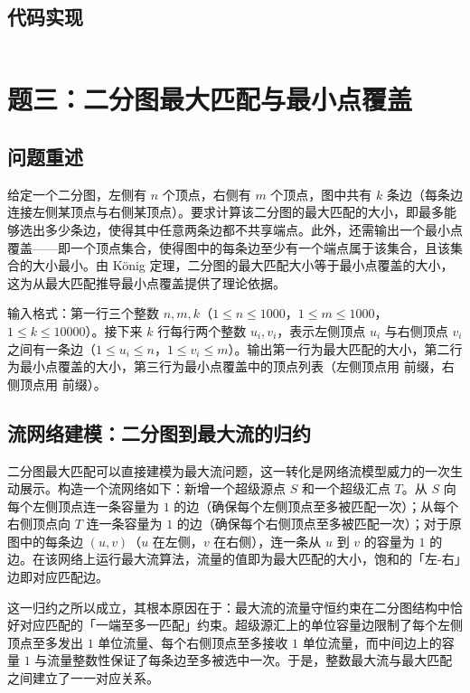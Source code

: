 \documentclass[12pt, a4paper]{academics}
\begin{document}
\subsection{代码实现}

\inputminted{c++}{../src/p2_dinic.cpp}

\section{题三：二分图最大匹配与最小点覆盖}

\subsection{问题重述}

给定一个二分图，左侧有 $n$ 个顶点，右侧有 $m$ 个顶点，图中共有 $k$ 条边（每条边连接左侧某顶点与右侧某顶点）。要求计算该二分图的最大匹配的大小，即最多能够选出多少条边，使得其中任意两条边都不共享端点。此外，还需输出一个最小点覆盖——即一个顶点集合，使得图中的每条边至少有一个端点属于该集合，且该集合的大小最小。由 K\"onig 定理，二分图的最大匹配大小等于最小点覆盖的大小，这为从最大匹配推导最小点覆盖提供了理论依据。

输入格式：第一行三个整数 $n, m, k$（$1 \le n \le 1000$，$1 \le m \le 1000$，$1 \le k \le 10000$）。接下来 $k$ 行每行两个整数 $u_i, v_i$，表示左侧顶点 $u_i$ 与右侧顶点 $v_i$ 之间有一条边（$1 \le u_i \le n$，$1 \le v_i \le m$）。输出第一行为最大匹配的大小，第二行为最小点覆盖的大小，第三行为最小点覆盖中的顶点列表（左侧顶点用  前缀，右侧顶点用  前缀）。


\subsection{流网络建模：二分图到最大流的归约}

二分图最大匹配可以直接建模为最大流问题，这一转化是网络流模型威力的一次生动展示。构造一个流网络如下：新增一个超级源点 $S$ 和一个超级汇点 $T$。从 $S$ 向每个左侧顶点连一条容量为 $1$ 的边（确保每个左侧顶点至多被匹配一次）；从每个右侧顶点向 $T$ 连一条容量为 $1$ 的边（确保每个右侧顶点至多被匹配一次）；对于原图中的每条边 $(u, v)$（$u$ 在左侧，$v$ 在右侧），连一条从 $u$ 到 $v$ 的容量为 $1$ 的边。在该网络上运行最大流算法，流量的值即为最大匹配的大小，饱和的「左-右」边即对应匹配边。

这一归约之所以成立，其根本原因在于：最大流的流量守恒约束在二分图结构中恰好对应匹配的「一端至多一匹配」约束。超级源汇上的单位容量边限制了每个左侧顶点至多发出 $1$ 单位流量、每个右侧顶点至多接收 $1$ 单位流量，而中间边上的容量 $1$ 与流量整数性保证了每条边至多被选中一次。于是，整数最大流与最大匹配之间建立了一一对应关系。
\end{document}
